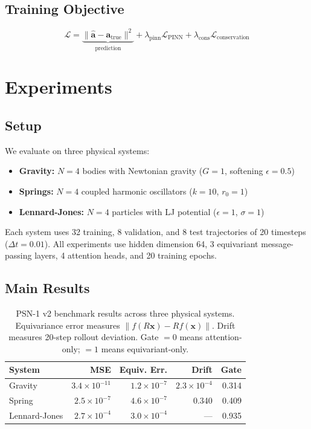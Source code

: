 \documentclass[10pt,twocolumn]{article}
\begin{document}
\subsection{Training Objective}
\begin{equation}
    \mathcal{L} = \underbrace{\|\hat{\mathbf{a}} - \mathbf{a}_{\text{true}}\|^2}_{\text{prediction}} + \lambda_{\text{pinn}} \mathcal{L}_{\text{PINN}} + \lambda_{\text{cons}} \mathcal{L}_{\text{conservation}}
\end{equation}

\section{Experiments}
\label{sec:experiments}

\subsection{Setup}
We evaluate on three physical systems:
\begin{itemize}
    \item \textbf{Gravity:} $N=4$ bodies with Newtonian gravity ($G=1$, softening $\epsilon=0.5$)
    \item \textbf{Springs:} $N=4$ coupled harmonic oscillators ($k=10$, $r_0=1$)
    \item \textbf{Lennard-Jones:} $N=4$ particles with LJ potential ($\epsilon=1$, $\sigma=1$)
\end{itemize}
Each system uses 32 training, 8 validation, and 8 test trajectories of 20 timesteps ($\Delta t = 0.01$). All experiments use hidden dimension 64, 3 equivariant message-passing layers, 4 attention heads, and 20 training epochs.

\subsection{Main Results}

\begin{table}[t]
\centering
\caption{PSN-1 v2 benchmark results across three physical systems. Equivariance error measures $\|f(R\mathbf{x}) - Rf(\mathbf{x})\|$. Drift measures 20-step rollout deviation. Gate $= 0$ means attention-only; $= 1$ means equivariant-only.}
\label{tab:main}
\begin{tabular}{lrrrr}
\toprule
System & MSE & Equiv. Err. & Drift & Gate \\
\midrule
Gravity & $3.4 \times 10^{-11}$ & $1.2 \times 10^{-7}$ & $2.3 \times 10^{-4}$ & 0.314 \\
Spring & $2.5 \times 10^{-7}$ & $4.6 \times 10^{-7}$ & 0.340 & 0.409 \\
Lennard-Jones & $2.7 \times 10^{-4}$ & $3.0 \times 10^{-4}$ & --- & 0.935 \\
\bottomrule
\end{tabular}
\end{table}
\end{document}
